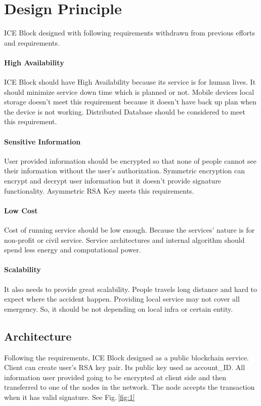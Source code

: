 \documentclass[conference]{IEEEtran}
\begin{document}
\section{Design Principle}
ICE Block designed with following requirements withdrawn from previous efforts and requirements.

\paragraph{High Availability}
ICE Block should have High Availability because its service is for human lives. It should minimize service down time which is planned or not. Mobile devices local storage doesn’t meet this requirement because it doesn’t have back up plan when the device is not working. Distributed Database should be considered to meet this requirement.

\paragraph{Sensitive Information}
User provided information should be encrypted so that none of people cannot see their information without the user’s authorization. Symmetric encryption can encrypt and decrypt user information but it doesn’t provide signature functionality. Asymmetric RSA Key meets this requirements.

\paragraph{Low Cost}
Cost of running service should be low enough. Because the services’ nature is for non-profit or civil service. Service architectures and internal algorithm should spend less energy and computational power.

\paragraph{Scalability}
It also needs to provide great scalability. People travels long distance and hard to expect where the accident happen. Providing local service may not cover all emergency. So, it should be not depending on local infra or certain entity.

\subsection{Architecture}
Following the requirements, ICE Block designed as a public blockchain service.
Client can create user’s RSA key pair.
Its public key used as account\_ID.
All information user provided going to be encrypted at client side and then transferred to one of the nodes in the network.
The node accepts the transaction when it has valid signature. See Fig.\,\ref{fig:1}
\end{document}
